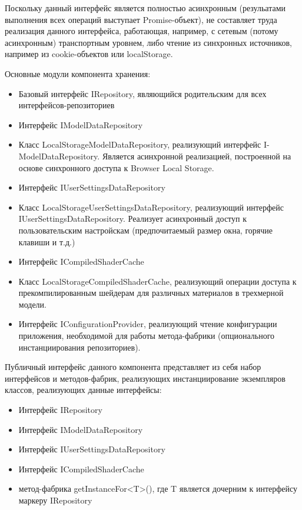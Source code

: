 Поскольку данный интерфейс является полностью асинхронным (резульатами выполнения всех операций выступает Promise-объект), не составляет труда реализация данного интерфейса, работающая, например, с
сетевым (потому асинхронным) транспортным уровнем, либо чтение из синхронных источников, например из cookie-объектов или localStorage. 

Основные модули компонента хранения:
\begin{itemize}
\item Базовый интерфейс IRepository, являющийся родительским для всех интерфейсов-репозиториев
\item Интерфейс IModelDataRepository
\item Класс LocalStorageModelDataRepository, реализующий интерфейс I-ModelDataRepository. Является асинхронной реализацией, построенной на основе синхронного доступа к Browser Local Storage.
\item Интерфейс IUserSettingsDataRepository
\item Класс LocalStorageUserSettingsDataRepository, реализующий интерфейс IUserSettingsDataRepository. Реализует асинхронный доступ к пользовательским настройскам (предпочитаемый размер окна,
горячие клавиши и т.д.)
\item Интерфейс ICompiledShaderCache
\item Класс LocalStorageCompiledShaderCache, реализующий операции доступа к прекомпилированным шейдерам для различных материалов в трехмерной модели.
\item Интерфейс IConfigurationProvider, реализующий чтение конфигурации приложения, необходимой для работы метода-фабрики (опционального инстанциирования репозиториев).
\end{itemize}

Публичный интерфейс данного компонента представляет из себя набор интерфейсов и методов-фабрик, реализующих инстанциирование экземпляров классов, реализующих данные интерфейсы:
\begin{itemize}
\item Интерфейс IRepository
\item Интерфейс IModelDataRepository
\item Интерфейс IUserSettingsDataRepository
\item Интерфейс ICompiledShaderCache
\item метод-фабрика getInstanceFor<T>(), где T является дочерним к интерфейсу маркеру IRepository
\end{itemize}